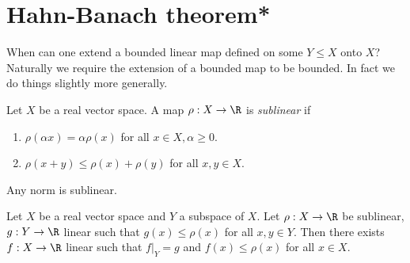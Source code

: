 \documentclass[a4paper]{article}
\begin{document}
\section{Hahn-Banach theorem*}

When can one extend a bounded linear map defined on some \(Y \leq X\) onto \(X\)? Naturally we require the extension of a bounded map to be bounded. In fact we do things slightly more generally.

\begin{definition}
  Let \(X\) be a real vector space. A map \(\rho: X \to \R\) is \emph{sublinear} if
  \begin{enumerate}
  \item \(\rho(\alpha x) = \alpha \rho(x)\) for all \(x \in X, \alpha \geq 0\).
  \item \(\rho(x + y) \leq \rho(x) + \rho(y)\) for all \(x, y \in X\).
  \end{enumerate}
\end{definition}

\begin{eg}
  Any norm is sublinear.
\end{eg}

\begin{theorem}
  \label{thm:Hahn-Banach}
  Let \(X\) be a real vector space and \(Y\) a subspace of \(X\). Let \(\rho: X \to \R\) be sublinear, \(g: Y \to \R\) linear such that \(g(x) \leq \rho(x)\) for all \(x, y \in Y\). Then there exists \(f: X \to \R\) linear such that \(f|_Y = g\) and \(f(x) \leq \rho(x)\) for all \(x \in X\).
\end{theorem}
\end{document}
